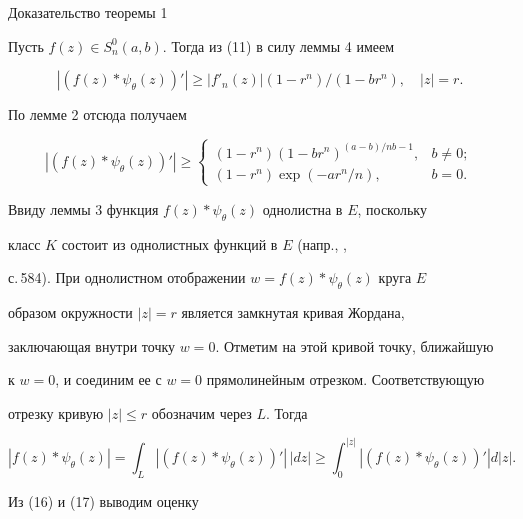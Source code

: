 \begin{pf*}{Доказательство теоремы 1} 


Пусть $f(z)\in S^0_n(a,b)$. Тогда из (11) в силу леммы 4 имеем 


$$ 


|(f(z)*\psi_\theta(z))'|\ge|f'_n(z)| 


(1-r^n)/(1-br^n),\quad |z|=r. 


$$ 


По лемме 2 отсюда получаем 


\begin{equation} 


|(f(z)*\psi_\theta(z))'|\ge 


\begin{cases} 


(1-r^n)(1-br^n)^{(a-b)/nb-1}, & b\ne 0;\\ 


(1-r^n)\exp(-ar^n/n), & b=0. 


\end{cases} 


\end{equation} 


 


Ввиду леммы 3 функция $f(z)*\psi_\theta(z)$ однолистна в $E$, поскольку 


класс $K$ состоит из однолистных функций в $E$ (напр., \cite{4}, 


с.\,584). При однолистном отображении $w=f(z)*\psi_\theta(z)$ круга $E$ 


образом окружности $|z|=r$ является замкнутая кривая Жордана, 


заключающая внутри точку $w=0$. Отметим на этой кривой точку, ближайшую 


к $w=0$, и соединим ее с $w=0$ прямолинейным отрезком. Соответствующую 


отрезку кривую $|z|\le r$ обозначим через $L$. Тогда 


\begin{equation} 


|f(z)*\psi_\theta(z)|=\int_L|(f(z)*\psi_\theta(z))'|\,|dz|\ge 


\int^{|z|}_0|(f(z)*\psi_\theta(z))'|d|z|. 


\end{equation} 


Из (16) и (17) выводим оценку 


\begin{equation} 



\end{equation}
\end{pf*}
